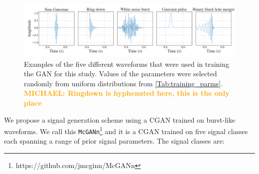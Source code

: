 \documentclass[12pt]{iopart}
\newcommand{\michael}[1]{\textbf{\textcolor{orange}{MICHAEL: #1}}}
\begin{document}
%
\begin{figure}
    \centering
    \includegraphics[width=\textwidth]{figures/training-sample.png}
    \caption{Examples of the five different waveforms that were used in training the \ac{GAN} for this study. Values of the parameters were selected randomly from uniform distributions from \cref{Tab:training_parms}. \michael{Ringdown is hyphenated here, this is the only place}}
    \label{fig:training_waveforms}
\end{figure}
%
We propose a signal generation scheme using a \ac{CGAN} trained on burst-like waveforms. We call this \texttt{McGANn}\footnote{https://github.com/jmcginn/McGANn} and it is a \ac{CGAN} trained on five signal classes each spanning a range of prior signal parameters. The signal classes are:
\end{document}

